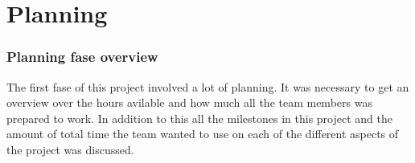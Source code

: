 \chapter{Planning}

\subsection{Planning fase overview}
The first fase of this project involved a lot of planning. It was necessary to get an overview over the hours avilable and how much all the team members was prepared to work. In addition to this all the milestones in this project and the amount of total time the team wanted to use on each of the different aspects of the project was discussed.


\newpage


\newpage



%
